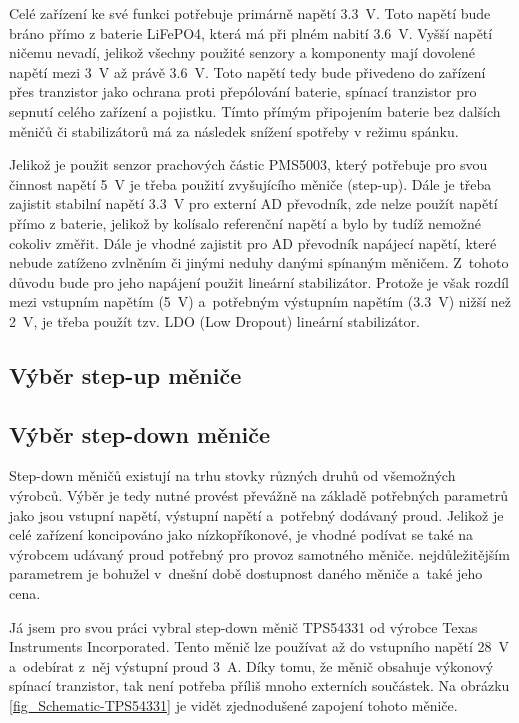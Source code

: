 Celé zařízení ke své funkci potřebuje primárně napětí \SI{3,3}{\volt}. Toto napětí bude bráno přímo z baterie LiFePO4, která má při plném nabití \SI{3,6}{\volt}. Vyšší napětí ničemu nevadí, jelikož všechny použité senzory a komponenty mají dovolené napětí mezi \SI{3}{\volt} až právě \SI{3,6}{\volt}. Toto napětí tedy bude přivedeno do zařízení přes tranzistor jako ochrana proti přepólování baterie, spínací tranzistor pro sepnutí celého zařízení a pojistku. Tímto přímým připojením baterie bez dalších měničů či stabilizátorů má za následek snížení spotřeby v režimu spánku. 

Jelikož je použit senzor prachových částic PMS5003, který potřebuje pro svou činnost napětí \SI{5}{\volt} je třeba použití zvyšujícího měniče (step-up). Dále je třeba zajistit stabilní napětí \SI{3,3}{\volt} pro externí AD převodník, zde nelze použít napětí přímo z baterie, jelikož by kolísalo referenční napětí a bylo by tudíž nemožné cokoliv změřit. Dále je vhodné zajistit pro AD převodník napájecí napětí, které nebude zatíženo zvlněním či jinými neduhy danými spínaným měničem. Z~tohoto důvodu bude pro jeho napájení použit lineární stabilizátor. Protože je však rozdíl mezi vstupním napětím (\SI{5}{\volt}) a~potřebným výstupním napětím (\SI{3,3}{\volt}) nižší než \SI{2}{\volt}, je třeba použít tzv. LDO (Low Dropout) lineární stabilizátor.

\subsection{Výběr step-up měniče}







\subsection{Výběr step-down měniče}

Step-down měničů existují na trhu stovky různých druhů od všemožných výrobců. Výběr je tedy nutné provést převážně na základě potřebných parametrů jako jsou vstupní napětí, výstupní napětí a~potřebný dodávaný proud. Jelikož je celé zařízení koncipováno jako nízkopříkonové, je vhodné podívat se také na výrobcem udávaný proud potřebný pro provoz samotného měniče. nejdůležitějším parametrem je bohužel v~dnešní době dostupnost daného měniče a~také jeho cena.

Já jsem pro svou práci vybral step-down měnič TPS54331 od výrobce Texas Instruments Incorporated\cite{dat_TPS54331}. Tento měnič lze používat až do vstupního napětí \SI{28}{\volt} a~odebírat z~něj výstupní proud \SI{3}{\ampere}. Díky tomu, že měnič obsahuje výkonový spínací tranzistor, tak není potřeba příliš mnoho externích součástek. Na obrázku \ref{fig_Schematic-TPS54331} je vidět zjednodušené zapojení tohoto měniče.

